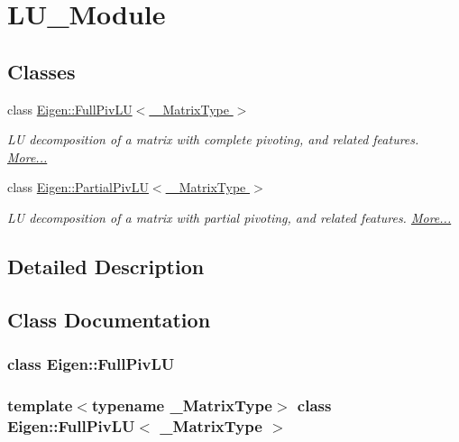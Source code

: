 \hypertarget{group___l_u___module}{}\section{L\+U\+\_\+\+Module}
\label{group___l_u___module}
\subsection*{Classes}
\begin{DoxyCompactItemize}
\item 
class \hyperlink{group___l_u___module_class_eigen_1_1_full_piv_l_u}{Eigen\+::\+Full\+Piv\+L\+U$<$ \+\_\+\+Matrix\+Type $>$}
\begin{DoxyCompactList}\small\item\em LU decomposition of a matrix with complete pivoting, and related features.  \hyperlink{group___l_u___module_class_eigen_1_1_full_piv_l_u}{More...}\end{DoxyCompactList}\item 
class \hyperlink{group___l_u___module_class_eigen_1_1_partial_piv_l_u}{Eigen\+::\+Partial\+Piv\+L\+U$<$ \+\_\+\+Matrix\+Type $>$}
\begin{DoxyCompactList}\small\item\em LU decomposition of a matrix with partial pivoting, and related features.  \hyperlink{group___l_u___module_class_eigen_1_1_partial_piv_l_u}{More...}\end{DoxyCompactList}\end{DoxyCompactItemize}


\subsection{Detailed Description}


\subsection{Class Documentation}
\label{class_eigen_1_1_full_piv_l_u}
\subsubsection{class Eigen\+:\+:Full\+Piv\+LU}
\subsubsection*{template$<$typename \+\_\+\+Matrix\+Type$>$\newline
class Eigen\+::\+Full\+Piv\+L\+U$<$ \+\_\+\+Matrix\+Type $>$}

